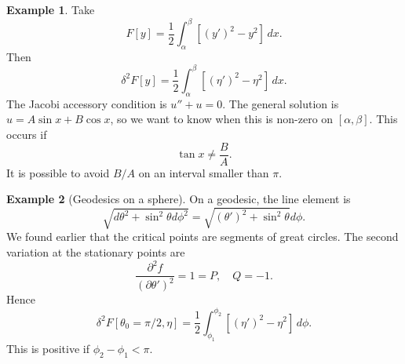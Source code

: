 \documentclass[12pt]{article}
\theoremstyle{definition}
\newtheorem{example}{Example}[section]
\theoremstyle{remark}
\begin{document}
\begin{adjustbox}{minipage = \columnwidth - 25.5pt, margin=1em, frame=1pt, margin=0em}
\begin{example}
	Take
	\[
		F[y] = \frac{1}{2} \int_{\alpha}^{\beta} [(y')^2 - y^2]\, dx
	.\]
	Then
	\[
		\delta^2F[y] = \frac{1}{2} \int_{\alpha}^{\beta} [(\eta')^2 - \eta^2]\, dx
	.\]
	The Jacobi accessory condition is $u'' + u = 0$. The general solution is $u = A \sin x + B \cos x$, so we want to know when this is non-zero on $[\alpha, \beta]$. This occurs if
	\[
	\tan x \neq \frac{B}{A}
	.\]
	It is possible to avoid $B/A$ on an interval smaller than $\pi$.
\end{example}
\end{adjustbox}

\begin{adjustbox}{minipage = \columnwidth - 25.5pt, margin=1em, frame=1pt, margin=0em}
\begin{example}[Geodesics on a sphere]
	On a geodesic, the line element is
	\[
		\sqrt{d\theta^2 + \sin^2\theta d\phi^2} = \sqrt{(\theta')^2 + \sin^2\theta}d\phi
	.\]
	We found earlier that the critical points are segments of great circles. The second variation at the stationary points are
	\[
		\frac{\partial^2f}{(\partial \theta')^2} = 1 = P, \quad Q = -1
	.\]
	Hence
	\[
		\delta^2F[\theta_0 = \pi/2, \eta] = \frac{1}{2} \int_{\phi_1}^{\phi_2}[(\eta')^2 - \eta^2]\, d\phi
	.\]
	This is positive if $\phi_2 - \phi_1 < \pi$. 
\end{example}
\end{adjustbox}


\newpage

\printindex
\end{document}
